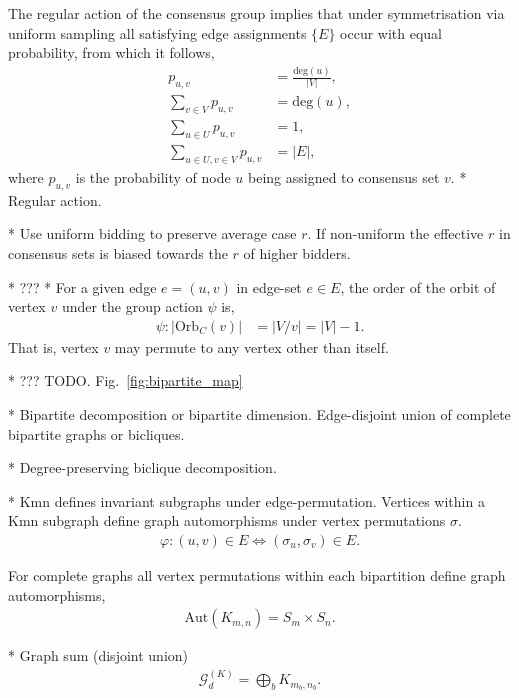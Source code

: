 The regular action of the consensus group implies that under symmetrisation via uniform sampling all satisfying edge assignments $\{E\}$ occur with equal probability, from which it follows,
\begin{align} \label{eq:prob_cons}
	p_{u,v}                       & = \frac{\mathrm{deg}(u)}{|V|},\nonumber \\
	\sum_{v\in V} p_{u,v}         & = \mathrm{deg}(u),\nonumber             \\
	\sum_{u\in U} p_{u,v}         & = 1, \nonumber                          \\
	\sum_{u\in U, v\in V} p_{u,v} & = |E|,
\end{align}
where $p_{u,v}$ is the probability of node $u$ being assigned to consensus set $v$.
* Regular action.

* Use uniform bidding to preserve average case $r$. If non-uniform the effective $r$ in consensus sets is biased towards the $r$ of higher bidders.

* ???
* For a given edge $e=(u,v)$ in edge-set $e\in E$, the order of the orbit of vertex $v$ under the group action $\psi$ is,
\begin{align}
	\psi: |\mathrm{Orb}_C(v)| & = |V/v| = |V|-1.
\end{align}
That is, vertex $v$ may permute to any vertex other than itself.

* ??? TODO. Fig.~\ref{fig:bipartite_map}

* Bipartite decomposition or bipartite dimension. Edge-disjoint union of complete bipartite graphs or bicliques.

* Degree-preserving biclique decomposition.

* Kmn defines invariant subgraphs under edge-permutation. Vertices within a Kmn subgraph define graph automorphisms under vertex permutations $\sigma$.
\begin{align}
	\varphi: (u,v)\in E \Longleftrightarrow (\sigma_u,\sigma_v)	\in E.
\end{align}

For complete graphs all vertex permutations within each bipartition define graph automorphisms,
\begin{align}
	\mathrm{Aut}(K_{m,n}) = S_m\times S_n.
\end{align}


* Graph sum (disjoint union)
\begin{align}
	\mathcal{G}_d^{(K)} = \bigoplus_{b} K_{m_b,n_b}.
\end{align}

